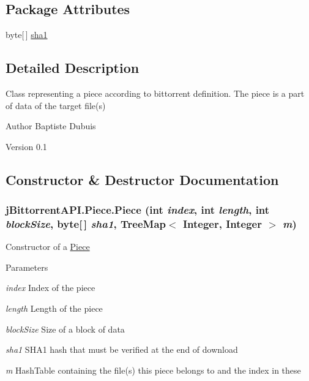 \subsection*{Package Attributes}
\begin{DoxyCompactItemize}
\item 
byte\mbox{[}$\,$\mbox{]} \hyperlink{classj_bittorrent_a_p_i_1_1_piece_ad13fc2f3c99d51ef782f875d882341cc}{sha1}
\end{DoxyCompactItemize}


\subsection{Detailed Description}
Class representing a piece according to bittorrent definition. The piece is a part of data of the target file(s)

\begin{DoxyAuthor}{Author}
Baptiste Dubuis 
\end{DoxyAuthor}
\begin{DoxyVersion}{Version}
0.1 
\end{DoxyVersion}


\subsection{Constructor \& Destructor Documentation}
\hypertarget{classj_bittorrent_a_p_i_1_1_piece_ae94988ffbe6559c92c33020151c5987b}{
\subsubsection[{Piece}]{\setlength{\rightskip}{0pt plus 5cm}jBittorrentAPI.Piece.Piece (int {\em index}, \/  int {\em length}, \/  int {\em blockSize}, \/  byte\mbox{[}$\,$\mbox{]} {\em sha1}, \/  TreeMap$<$ Integer, Integer $>$ {\em m})}}
\label{classj_bittorrent_a_p_i_1_1_piece_ae94988ffbe6559c92c33020151c5987b}
Constructor of a \hyperlink{classj_bittorrent_a_p_i_1_1_piece}{Piece} 
\begin{DoxyParams}{Parameters}
\item[{\em index}]Index of the piece \item[{\em length}]Length of the piece \item[{\em blockSize}]Size of a block of data \item[{\em sha1}]SHA1 hash that must be verified at the end of download \item[{\em m}]HashTable containing the file(s) this piece belongs to and the index in these \end{DoxyParams}


